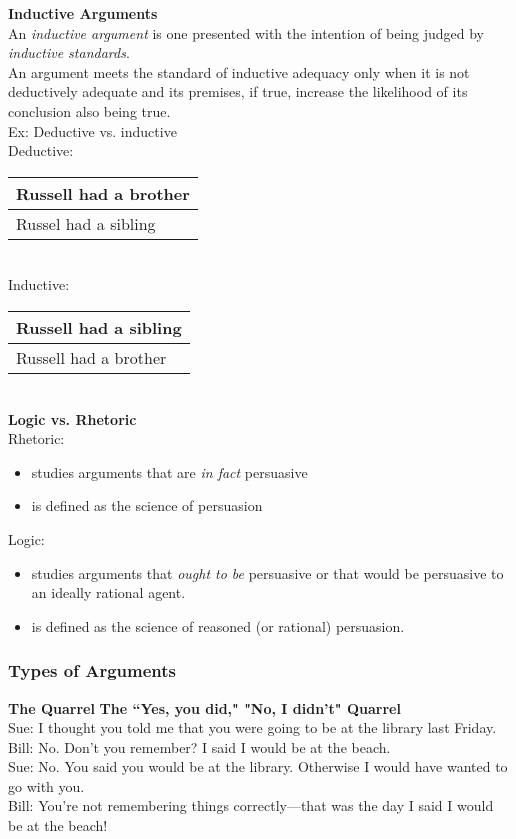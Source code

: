 \textbf{Inductive Arguments}\\
An \textit{inductive argument} is one presented with the intention of being judged by \textit{inductive standards}.\\
An argument meets the standard of inductive adequacy only when it is not deductively adequate and its premises, if true, increase the likelihood of its conclusion also being true.\\
Ex: Deductive vs. inductive\\
Deductive:\\
\begin{tabular}{p{16cm}}
Russell had a brother\\
\hline
Russel had a sibling
\end{tabular}\\

Inductive:\\
\begin{tabular}{p{16cm}}
Russell had a sibling\\
\hline
Russell had a brother
\end{tabular}\\

\textbf{Logic vs. Rhetoric}\\
Rhetoric:
\begin{itemize}
    \item studies arguments that are \textit{in fact} persuasive
    \item is defined as the science of persuasion
\end{itemize}
Logic:
\begin{itemize}
    \item studies arguments that \textit{ought to be} persuasive or that would be persuasive to an ideally rational agent.
    \item is defined as the science of reasoned (or rational) persuasion.
\end{itemize}

\subsubsection{Types of Arguments}
\textbf{The Quarrel}
\textbf{The ``Yes, you did," "No, I didn't" Quarrel}\\
Sue: I thought you told me that you were going to be at the library last Friday.\\
Bill: No. Don't you remember? I said I would be at the beach.\\
Sue: No. You said you would be at the library. Otherwise I would have wanted to go with you.\\
Bill: You're not remembering things correctly—that was the day I said I would be at the beach!\\

